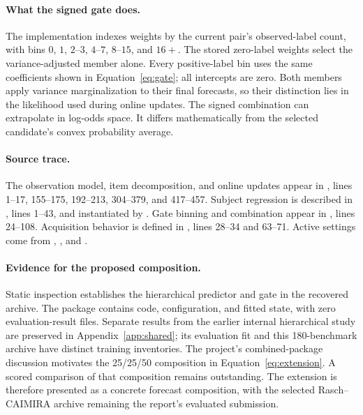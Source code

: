 \paragraph{What the signed gate does.}
The implementation indexes weights by the current pair's observed-label count, with bins $0$, $1$, $2$--$3$, $4$--$7$, $8$--$15$, and $16+$. The stored zero-label weights select the variance-adjusted member alone. Every positive-label bin uses the same coefficients shown in Equation~\ref{eq:gate}; all intercepts are zero. Both members apply variance marginalization to their final forecasts, so their distinction lies in the likelihood used during online updates. The signed combination can extrapolate in log-odds space. It differs mathematically from the selected candidate's convex probability average.

\paragraph{Source trace.}
The observation model, item decomposition, and online updates appear in , lines 1--17, 155--175, 192--213, 304--379, and 417--457. Subject regression is described in , lines 1--43, and instantiated by . Gate binning and combination appear in , lines 24--108. Acquisition behavior is defined in , lines 28--34 and 63--71. Active settings come from , , and .

\paragraph{Evidence for the proposed composition.}
Static inspection establishes the hierarchical predictor and gate in the recovered archive. The package contains code, configuration, and fitted state, with zero evaluation-result files. Separate results from the earlier internal hierarchical study are preserved in Appendix~\ref{app:shared}; its evaluation fit and this 180-benchmark archive have distinct training inventories. The project's combined-package discussion motivates the 25/25/50 composition in Equation~\ref{eq:extension}. A scored comparison of that composition remains outstanding. The extension is therefore presented as a concrete forecast composition, with the selected Rasch--CAIMIRA archive remaining the report's evaluated submission.

\clearpage
